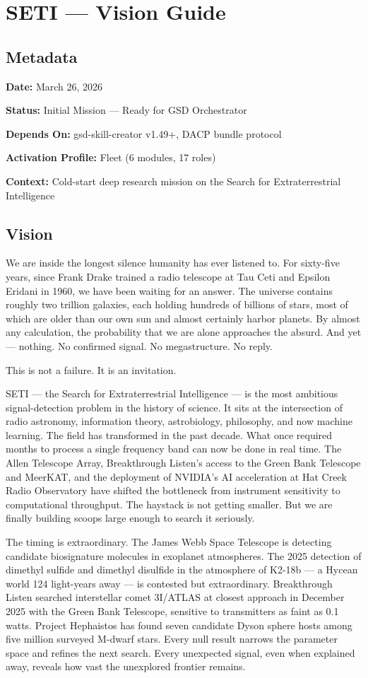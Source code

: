 \documentclass[11pt,letterpaper]{article}
\newcommand{\metafield}[2]{\textbf{\sffamily #1} #2\par}
\begin{document}
\section{SETI --- Vision Guide}

\subsection{Metadata}

\metafield{Date:}{March 26, 2026}
\metafield{Status:}{Initial Mission --- Ready for GSD Orchestrator}
\metafield{Depends On:}{gsd-skill-creator v1.49+, DACP bundle protocol}
\metafield{Activation Profile:}{Fleet (6 modules, 17 roles)}
\metafield{Context:}{Cold-start deep research mission on the Search for Extraterrestrial Intelligence}

\subsection{Vision}

We are inside the longest silence humanity has ever listened to. For sixty-five years, since Frank Drake trained a radio telescope at Tau Ceti and Epsilon Eridani in 1960, we have been waiting for an answer. The universe contains roughly two trillion galaxies, each holding hundreds of billions of stars, most of which are older than our own sun and almost certainly harbor planets. By almost any calculation, the probability that we are alone approaches the absurd. And yet --- nothing. No confirmed signal. No megastructure. No reply.

This is not a failure. It is an invitation.

SETI --- the Search for Extraterrestrial Intelligence --- is the most ambitious signal-detection problem in the history of science. It sits at the intersection of radio astronomy, information theory, astrobiology, philosophy, and now machine learning. The field has transformed in the past decade. What once required months to process a single frequency band can now be done in real time. The Allen Telescope Array, Breakthrough Listen's access to the Green Bank Telescope and MeerKAT, and the deployment of NVIDIA's AI acceleration at Hat Creek Radio Observatory have shifted the bottleneck from instrument sensitivity to computational throughput. The haystack is not getting smaller. But we are finally building scoops large enough to search it seriously.

The timing is extraordinary. The James Webb Space Telescope is detecting candidate biosignature molecules in exoplanet atmospheres. The 2025 detection of dimethyl sulfide and dimethyl disulfide in the atmosphere of K2-18b --- a Hycean world 124 light-years away --- is contested but extraordinary. Breakthrough Listen searched interstellar comet 3I/ATLAS at closest approach in December 2025 with the Green Bank Telescope, sensitive to transmitters as faint as 0.1 watts. Project Hephaistos has found seven candidate Dyson sphere hosts among five million surveyed M-dwarf stars. Every null result narrows the parameter space and refines the next search. Every unexpected signal, even when explained away, reveals how vast the unexplored frontier remains.
\end{document}
